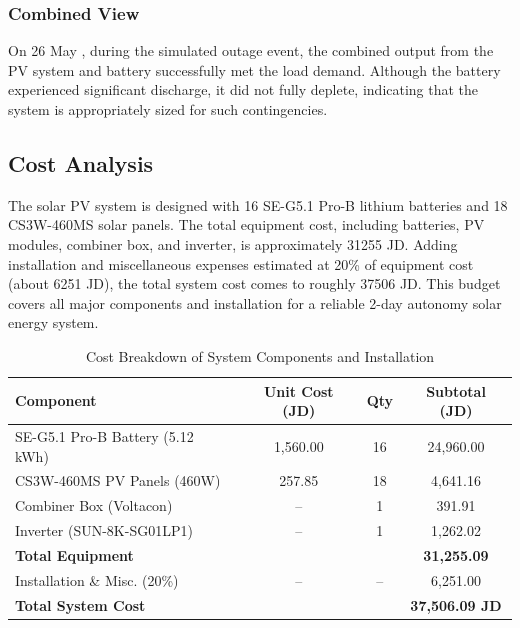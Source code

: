 \documentclass{article}
\begin{document}
\subsubsection{Combined View}
On 26 May , during the simulated outage event, the combined output from the PV system and battery successfully met the load demand. Although the battery experienced significant discharge, it did not fully deplete, indicating that the system is appropriately sized for such contingencies.
\subsection{Cost Analysis }
The solar PV system is designed with 16 SE-G5.1 Pro-B lithium batteries and 18 CS3W-460MS solar panels. The total equipment cost, including batteries, PV modules, combiner box, and inverter, is approximately 31255 JD. Adding installation and miscellaneous expenses estimated at 20\% of equipment cost (about 6251 JD), the total system cost comes to roughly 37506 JD. This budget covers all major components and installation for a reliable 2-day autonomy solar energy system.
\begin{table}[H]
    \centering
    \begin{tabular}{|l|c|c|c|}
    \hline
    \textbf{Component} & \textbf{Unit Cost (JD)} & \textbf{Qty} & \textbf{Subtotal (JD)} \\
    \hline
    SE-G5.1 Pro-B Battery (5.12 kWh) & 1,560.00 & 16 & 24,960.00 \\
    CS3W-460MS PV Panels (460W)      & 257.85   & 18 & 4,641.16 \\
    Combiner Box (Voltacon)          & –        & 1  & 391.91 \\
    Inverter (SUN-8K-SG01LP1)        & –        & 1  & 1,262.02 \\
    \hline
    \textbf{Total Equipment}         &          &    & \textbf{31,255.09} \\
    Installation \& Misc. (20\%)     & –        & –  & 6,251.00 \\
    \hline
    \textbf{Total System Cost}       &          &    & \textbf{37,506.09 JD} \\
    \hline
    \end{tabular}
    \caption{Cost Breakdown of System Components and Installation}
    \label{tab:cost_breakdown}
\end{table}
\end{document}
